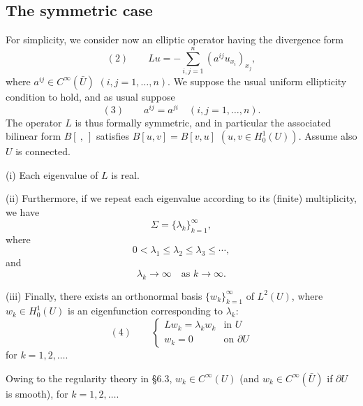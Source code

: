 \subsection{The symmetric case}

For simplicity, we consider now an elliptic operator having the divergence form
$$(2) \qquad Lu = -\sum_{i,j=1}^n (a^{ij}u_{x_i})_{x_j},$$
where $a^{ij} \in C^\infty(\bar U)$ $(i,j=1,\ldots,n)$. We suppose the usual uniform ellipticity condition to hold, and as usual suppose
$$(3) \qquad a^{ij} = a^{ji} \quad (i,j=1,\ldots,n).$$
The operator $L$ is thus formally symmetric, and in particular the associated bilinear form $B[\ ,\ ]$ satisfies $B[u,v] = B[v,u]$ $(u,v \in H_0^1(U))$. Assume also $U$ is connected.

\begin{theorem}
\label{thm:existence-eigenvalues-symmetric-operator}
(i) Each eigenvalue of $L$ is real.

(ii) Furthermore, if we repeat each eigenvalue according to its (finite) multiplicity, we have
$$\Sigma = \{\lambda_k\}_{k=1}^\infty,$$
where
$$0 < \lambda_1 \leq \lambda_2 \leq \lambda_3 \leq \cdots,$$
and
$$\lambda_k \to \infty \quad \text{as } k \to \infty.$$

(iii) Finally, there exists an orthonormal basis $\{w_k\}_{k=1}^\infty$ of $L^2(U)$, where $w_k \in H_0^1(U)$ is an eigenfunction corresponding to $\lambda_k$:
$$(4) \qquad \begin{cases} Lw_k = \lambda_k w_k & \text{in } U \\ w_k = 0 & \text{on } \partial U \end{cases}$$
for $k = 1,2,\ldots$.
\end{theorem}

\begin{remark}
\label{rem:eigenfunctions-smoothness}
Owing to the regularity theory in \S6.3, $w_k \in C^\infty(U)$ (and $w_k \in C^\infty(\bar U)$ if $\partial U$ is smooth), for $k = 1,2,\ldots$.
\end{remark}

